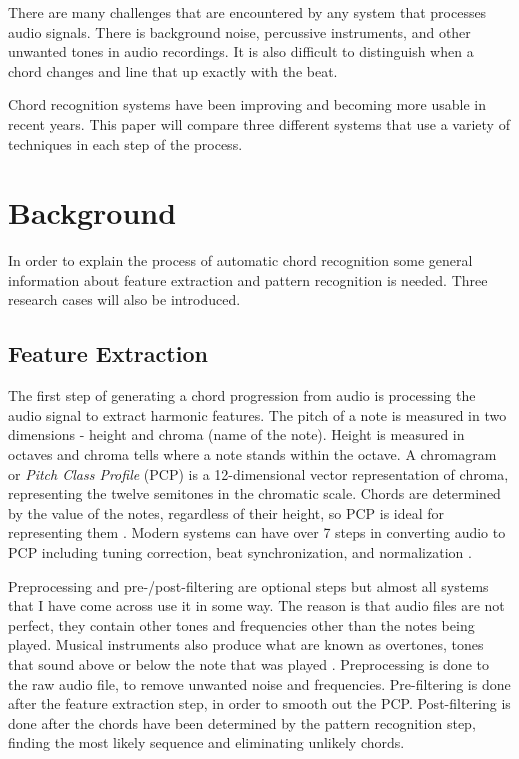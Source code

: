 \documentclass{sig-alternate}
\begin{document}
There are many challenges that are encountered by any system that processes audio signals. There is background noise, percussive instruments, and other unwanted tones in audio recordings. It is also difficult to distinguish when a chord changes and line that up exactly with the beat.  

Chord recognition systems have been improving and becoming more usable in recent years. This paper will compare three different systems that use a variety of techniques in each step of the process. 


\section{Background}

In order to explain the process of automatic chord recognition some general information about feature extraction and pattern recognition is needed. Three research cases will also be introduced.

\subsection{Feature Extraction}

The first step of generating a chord progression from audio is processing the audio signal to extract harmonic features. The pitch of a note is measured in two dimensions - height and chroma (name of the note). Height is measured in octaves and chroma tells where a note stands within the octave. A chromagram or \textit{Pitch Class Profile} (PCP) is a 12-dimensional vector representation of chroma, representing the twelve semitones in the chromatic scale. Chords are determined by the value of the notes, regardless of their height, so PCP is ideal for representing them \cite{Lee:2006}. Modern systems can have over 7 steps in converting audio to PCP including tuning correction, beat synchronization, and normalization \cite{McVicar:2014}.

Preprocessing and pre-/post-filtering are optional steps but almost all systems that I have come across use it in some way. The reason is that audio files are not perfect, they contain other tones and frequencies other than the notes being played. Musical instruments also produce what are known as overtones, tones that sound above or below the note that was played \cite{TaeMin:2014}. Preprocessing is done to the raw audio file, to remove unwanted noise and frequencies. Pre-filtering is done after the feature extraction step, in order to smooth out the PCP. Post-filtering is done after the chords have been determined by the pattern recognition step, finding the most likely sequence and eliminating unlikely chords. 
\end{document}
